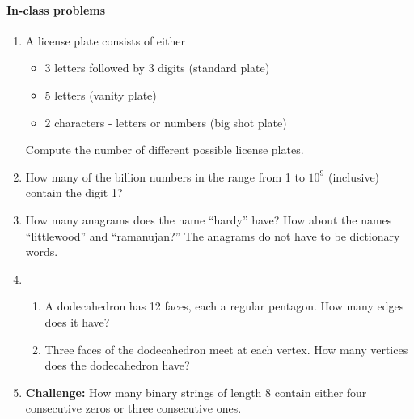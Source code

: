 \documentclass[12pt]{article}
\begin{document}
\pagebreak



\pagebreak

\paragraph*{In-class problems}

\begin{enumerate}

\item A license plate consists of either 
\begin{itemize}
\item 3 letters followed by 3 digits (standard plate)
\item 5 letters (vanity plate)
\item 2 characters - letters or numbers (big shot plate)
\end{itemize}
Compute the number of different possible license plates.

\item How many of the billion numbers in the range from 1 to $10^9$ (inclusive) contain the digit 1?

\item How many anagrams does the name ``hardy'' have? How about the names ``littlewood'' and ``ramanujan?'' The anagrams do not have to be dictionary words. 


\item \begin{enumerate}
\item A dodecahedron has 12 faces, each a regular pentagon. How many edges does it have?
\item Three faces of the dodecahedron meet at each vertex.  How many vertices does the dodecahedron have?



\end{enumerate}



\item {\bf Challenge:} How many binary strings of length 8 contain either four consecutive zeros or three consecutive ones. 




\end{enumerate}

\pagebreak
\end{document}
